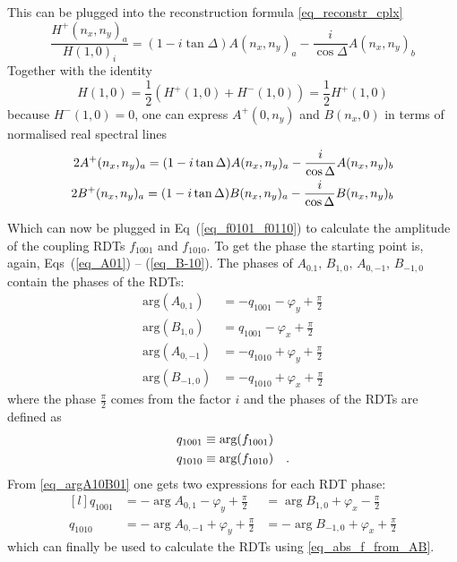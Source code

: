 %
This can be plugged into the reconstruction formula \eqref{eq_reconstr_cplx}
%
\begin{equation}
    \frac{H^+(n_x,n_y)_a}{H(1,0)_i} = (1-i\tan\Delta)A(n_x,n_y)_a - \frac{i}{\cos\Delta}A(n_x,n_y)_b
    \label{eq_reconstr_from_norm}
\end{equation}
%
Together with the identity
%
\begin{equation}
    H(1,0) = \frac{1}{2} \left( H^+(1,0) + {H^-(1,0)}\right) = \frac{1}{2}H^+(1,0)
\end{equation}
%
because $H^-(1,0) = 0$, one can express $A^+(0,n_y)$ and $B(n_x, 0)$ in terms of normalised real spectral lines
%
\begin{align}
    2A^+(n_x,n_y)_a = (1-i\tan\Delta)A(n_x,n_y)_a - \frac{i}{\cos\Delta}A(n_x,n_y)_b \notag \\
    2B^+(n_x,n_y)_a = (1-i\tan\Delta)B(n_x,n_y)_a - \frac{i}{\cos\Delta}B(n_x,n_y)_b
    \label{eq_recon_AB}
\end{align}
%

Which can now be plugged in Eq~(\ref{eq_f0101_f0110}) to calculate the amplitude of the coupling RDTs
$f_{1001}$ and $f_{1010}$. To get the phase the starting point is, again, Eqs~(\ref{eq_A01}) -- (\ref{eq_B-10}).
The phases of $A_{0.1},\,B_{1,0},\,A_{0,-1},\,B_{-1,0}$ contain the phases of the RDTs:
%
\begin{align}
  \text{arg}(A_{0,1}) &= -q_{1001} -\varphi_y +\tfrac{\pi}{2} \\
  \text{arg}(B_{1,0}) &= q_{1001} -\varphi_x +\tfrac{\pi}{2} \\
  \text{arg}(A_{0,-1}) &= -q_{1010} +\varphi_y +\tfrac{\pi}{2} \\
  \text{arg}(B_{-1,0}) &= -q_{1010} +\varphi_x +\tfrac{\pi}{2}
  \label{eq_argA10B01}
\end{align}
%
where the phase $\frac{\pi}{2}$ comes from the factor $i$ and the phases of the RDTs are defined as
%
\begin{align}
  q_{1001} &\equiv \text{arg}(f_{1001})\\
  q_{1010} &\equiv \text{arg}(f_{1010})
  \quad .
  \label{eq_arg_f1001}
\end{align}
%
From \eqref{eq_argA10B01} one gets two expressions for each RDT phase:
%
\begin{equation}
  \begin{matrix*}[l]
  q_{1001} &= -\arg{A_{0,1}}-\varphi_y + \tfrac{\pi}{2} &= \arg{B_{1,0}}+\varphi_x -\tfrac{\pi}{2}\\
  q_{1010} &= -\arg{A_{0,-1}} +\varphi_y + \tfrac{\pi}{2} &= -\arg{B_{-1,0}}+\varphi_x +\tfrac{\pi}{2}
  \label{eq_q1001q1010}
  \end{matrix*}
\end{equation}
%
which can finally be used to calculate the RDTs using \eqref{eq_abs_f_from_AB}.

